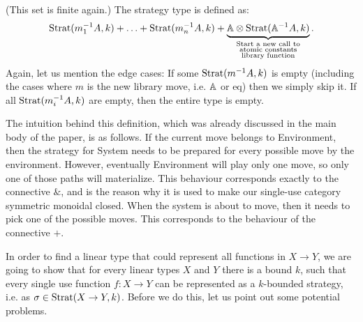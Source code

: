 \begin{definition}
\begin{itemize}
\begin{itemize}
               (This set is finite again.) The strategy type is defined as: 
               \begin{align*}
                \text{Strat}(m_1^{-1}A, k) + \ldots + \text{Strat}(m_n^{-1}A, k) + \underbrace{\mathbb A \otimes \text{Strat}(\mathbb A^{-1}A, k)}_{\substack{\textrm{Start a new call to}\\
                \textrm{atomic constants}\\
                \textrm{library function}}}.
               \end{align*}
               Again, let us mention the edge cases: If some $\text{Strat}(m^{-1}A, k)$ is empty (including the cases where $m$ is the new library move, i.e. $\mathbb A$ or $\text{eq}$)
               then we simply skip it. If all $\text{Strat}(m_i^{-1}A, k)$ are empty, then the entire type is empty.
    \end{itemize}
\end{itemize}
\end{definition}
The intuition behind this definition, which was already discussed in the main body of the paper, is as follows. If the current move belongs to Environment, then the strategy 
for System needs to be prepared for every possible move by the environment. However, eventually Environment 
will play only one move, so only one of those paths will materialize. This behaviour corresponds exactly to the connective $\&$, and is the reason why  it is used to make our single-use category symmetric monoidal closed.
When the system is about to move, then it needs to pick one of the possible moves. This corresponds to the behaviour of the connective $+$.

In order to find a linear type that could represent all functions in $X \to Y$, we are going to show 
that for every linear types $X$ and $Y$ there is a bound $k$, such that every single use function $f : X \to Y$
can be represented as a $k$-bounded strategy, i.e. as $\sigma \in \text{Strat}(X \to Y, k)$. Before we do this, 
let us point out some potential problems. 

